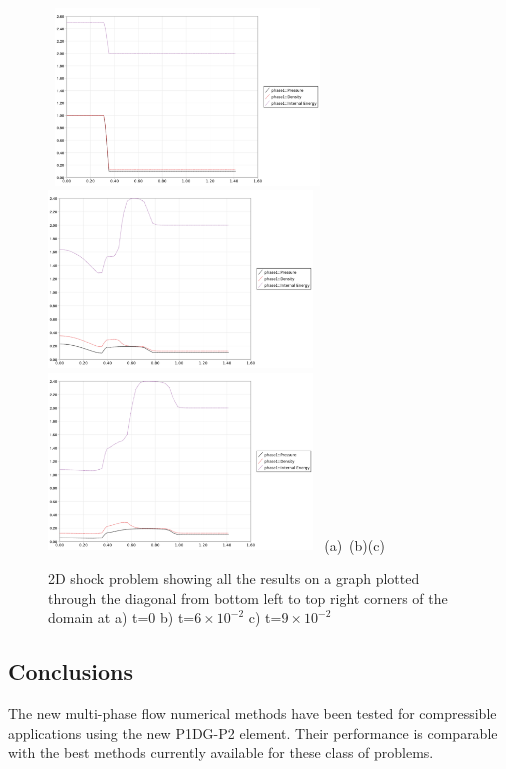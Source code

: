\begin{figure}[H]
\vbox{
\hbox{
\hspace{-1.cm}
\includegraphics[width=7.0cm]{./doc_figures/shock/2d-shock-g0}
\hspace{-1.cm}
\includegraphics[width=7.0cm]{./doc_figures/shock/2d-shock-g60}
\hspace{-1.cm}
\includegraphics[width=7.0cm]{./doc_figures/shock/2d-shock-g90}
}
\vspace{-0.cm}
\hbox{\hspace{4.cm}(a) \hspace{4.5cm}(b)\hspace{4.5cm}(c)}
\vspace{-0.cm}}
\label{2d-graphs}
\caption{ 2D shock problem showing all the results on a 
graph plotted through the diagonal from bottom left to top right 
corners of the domain at a) 
t=0 b) t=$6\times 10^{-2}$ c) t=$9\times 10^{-2}$ }
\end{figure}






\subsection{Conclusions} 
The new multi-phase flow numerical methods have been 
tested for compressible applications using the 
new P1DG-P2 element. Their performance 
is comparable with the best methods currently available 
for these class of problems. 




